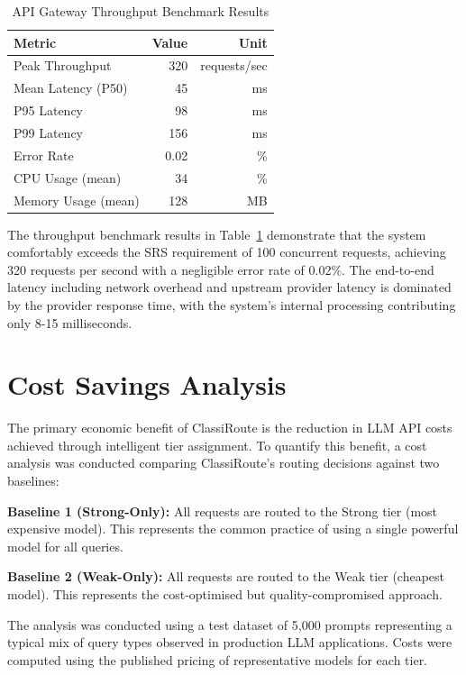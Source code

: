 \documentclass[oneside,12pt,a4paper]{report}
\begin{document}
\begin{table}[htbp]
  \centering
  \caption{API Gateway Throughput Benchmark Results}
  \label{tab:throughput_benchmark}
  \begin{tabular}{lrr}
    \toprule
    \textbf{Metric} & \textbf{Value} & \textbf{Unit} \\
    \midrule
    Peak Throughput & 320 & requests/sec \\
    Mean Latency (P50) & 45 & ms \\
    P95 Latency & 98 & ms \\
    P99 Latency & 156 & ms \\
    Error Rate & 0.02 & \% \\
    CPU Usage (mean) & 34 & \% \\
    Memory Usage (mean) & 128 & MB \\
    \bottomrule
  \end{tabular}
\end{table}

The throughput benchmark results in Table~\ref{tab:throughput_benchmark} demonstrate that the system comfortably exceeds the SRS requirement of 100 concurrent requests, achieving 320 requests per second with a negligible error rate of 0.02\%. The end-to-end latency including network overhead and upstream provider latency is dominated by the provider response time, with the system's internal processing contributing only 8-15 milliseconds.

\section{Cost Savings Analysis}

The primary economic benefit of ClassiRoute is the reduction in LLM API costs achieved through intelligent tier assignment. To quantify this benefit, a cost analysis was conducted comparing ClassiRoute's routing decisions against two baselines:

\textbf{Baseline 1 (Strong-Only):} All requests are routed to the Strong tier (most expensive model). This represents the common practice of using a single powerful model for all queries.

\textbf{Baseline 2 (Weak-Only):} All requests are routed to the Weak tier (cheapest model). This represents the cost-optimised but quality-compromised approach.

The analysis was conducted using a test dataset of 5,000 prompts representing a typical mix of query types observed in production LLM applications. Costs were computed using the published pricing of representative models for each tier.
\end{document}

